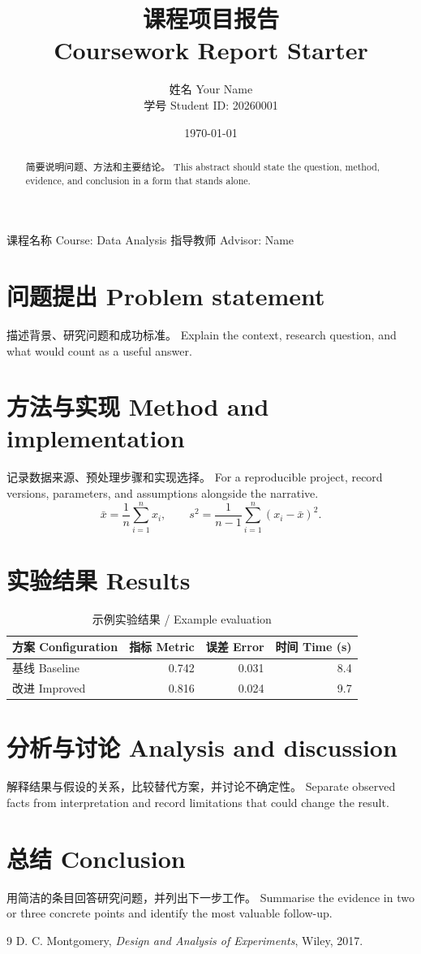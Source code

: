 \documentclass[UTF8,a4paper,12pt]{ctexart}
\title{课程项目报告\\\large Coursework Report Starter}
\author{姓名 Your Name\\学号 Student ID: 20260001}
\date{\today}
\begin{document}
\maketitle
\begin{center}
课程名称 Course: Data Analysis \qquad 指导教师 Advisor: Name
\end{center}

\begin{abstract}
简要说明问题、方法和主要结论。 This abstract should state the question,
method, evidence, and conclusion in a form that stands alone.
\end{abstract}

\section{问题提出 Problem statement}
描述背景、研究问题和成功标准。 Explain the context, research question, and
what would count as a useful answer.

\section{方法与实现 Method and implementation}
记录数据来源、预处理步骤和实现选择。 For a reproducible project, record
versions, parameters, and assumptions alongside the narrative.
\begin{equation}
  \bar{x}=\frac1n\sum_{i=1}^{n}x_i,\qquad
  s^2=\frac1{n-1}\sum_{i=1}^{n}(x_i-\bar{x})^2.
\end{equation}

\clearpage
\section{实验结果 Results}
\begin{table}[ht]
\centering
\caption{示例实验结果 / Example evaluation}
\begin{tabular}{@{}lrrr@{}}
\toprule
方案 Configuration & 指标 Metric & 误差 Error & 时间 Time (s)\\\midrule
基线 Baseline & 0.742 & 0.031 & 8.4\\
改进 Improved & 0.816 & 0.024 & 9.7\\
\bottomrule
\end{tabular}
\end{table}

\section{分析与讨论 Analysis and discussion}
解释结果与假设的关系，比较替代方案，并讨论不确定性。 Separate observed
facts from interpretation and record limitations that could change the result.

\section{总结 Conclusion}
用简洁的条目回答研究问题，并列出下一步工作。 Summarise the evidence in
two or three concrete points and identify the most valuable follow-up.

\begin{thebibliography}{9}
 D. C. Montgomery, \emph{Design and Analysis of
  Experiments}, Wiley, 2017.
\end{thebibliography}
\end{document}
